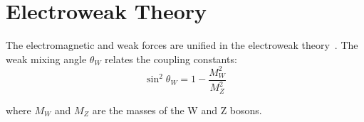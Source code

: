 \section{Electroweak Theory}
\label{sec:THEORY_ELECTROWEAK_THEORY}

The electromagnetic and weak forces are unified in the electroweak theory~\cite{standardmodel,weinberg-model,salam-ward}. The weak mixing angle $\theta_W$ relates the coupling constants:
\begin{equation}
  \sin^2\theta_W = 1 - \frac{M_W^2}{M_Z^2}
  \label{eq:weinberg-angle}
\end{equation}

where $M_W$ and $M_Z$ are the masses of the W and Z bosons.

